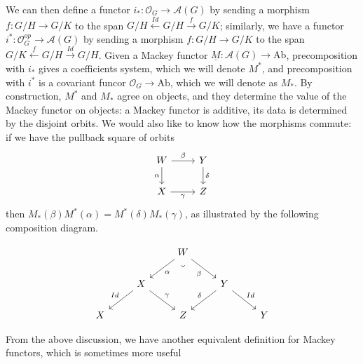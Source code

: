 \documentclass{article}
\theoremstyle{definition}
\begin{document}
We can then define a functor $i_*:\mathcal{O}_G\to \mathcal{A}(G)$ by sending a morphism $f:G/H\to G/K$ to the span $G/H\xleftarrow{Id}G/H\xrightarrow{f}G/K$; similarly, we have a functor $i^*:\mathcal{O}^{op}_G\to \mathcal{A}(G)$ by sending a morphism $f:G/H\to G/K$ to the span $G/K\xleftarrow{f}G/H\xrightarrow{Id}G/H$. Given a Mackey functor $\underline{M}: \mathcal{A}(G)\to \textrm{Ab}$, precomposition with $i_*$ gives a coefficients system, which we will denote $M^*$, and precomposition with $i^*$ is a covariant funcor $\mathcal{O}_G\to \textrm{Ab}$, which we will denote as $M_*$. By construction, $M^*$ and $M_*$ agree on objects, and they determine the value of the Mackey functor on objects: a Mackey functor is additive, its data is determined by the disjoint orbits. We would also like to know how the morphisms commute: if we have the pullback square of orbits
\[\begin{tikzcd}
	W & Y \\
	X & Z
	\arrow["\beta", from=1-1, to=1-2]
	\arrow["\alpha"', from=1-1, to=2-1]
	\arrow["\delta", from=1-2, to=2-2]
	\arrow["\gamma"', from=2-1, to=2-2]
\end{tikzcd}\]
then $M_*(\beta)M^*(\alpha)=M^*(\delta)M_*(\gamma)$, as illustrated by the following composition diagram. 

\[\begin{tikzcd}
	&& W \\
	& X && Y \\
	X && Z & {} & Y
	\arrow["\alpha", from=1-3, to=2-2]
	\arrow["\beta"', from=1-3, to=2-4]
	\arrow["\lrcorner"{anchor=center, pos=0.125, rotate=-45}, draw=none, from=1-3, to=3-3]
	\arrow["Id"', from=2-2, to=3-1]
	\arrow["\gamma", from=2-2, to=3-3]
	\arrow["\delta"', from=2-4, to=3-3]
	\arrow["Id", from=2-4, to=3-5]
\end{tikzcd}\]

From the above discussion, we have another equivalent definition for Mackey functors, which is sometimes more useful 
\end{document}
